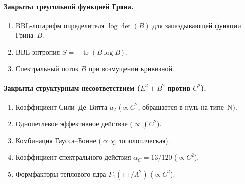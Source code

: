 \documentclass[12pt,a4paper]{article}
\theoremstyle{plain}
\theoremstyle{definition}
\theoremstyle{remark}
\newcommand{\tr}{\operatorname{tr}}
\begin{document}
\paragraph{Закрыты треугольной функцией Грина.}
\begin{enumerate}[resume]
\item BBL-логарифм определителя $\log\det(B)$ для
  запаздывающей функции Грина~$B$.
\item BBL-энтропия $S = -\tr(B \log B)$.
\item Спектральный поток $B$ при возмущении кривизной.
\end{enumerate}

\paragraph{Закрыты структурным несоответствием
($E^2 + B^2$ против $C^2$).}
\begin{enumerate}[resume]
\item Коэффициент Сили--Де~Витта $a_2$ ($\propto C^2$,
  обращается в нуль на типе~N).
\item Однопетлевое эффективное действие ($\propto \int C^2$).
\item Комбинация Гаусса--Бонне ($\propto \chi$,
  топологическая).
\item Коэффициент спектрального действия
  $\alpha_C = 13/120$ ($\propto C^2$).
\item Формфакторы теплового ядра $F_1(\Box/\Lambda^2)$
  ($\propto C^2$).
\end{enumerate}
\end{document}
